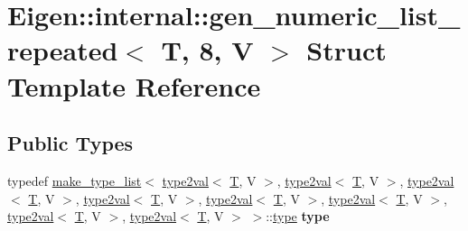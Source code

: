 \hypertarget{struct_eigen_1_1internal_1_1gen__numeric__list__repeated_3_01_t_00_018_00_01_v_01_4}{}\section{Eigen\+:\+:internal\+:\+:gen\+\_\+numeric\+\_\+list\+\_\+repeated$<$ T, 8, V $>$ Struct Template Reference}
\label{struct_eigen_1_1internal_1_1gen__numeric__list__repeated_3_01_t_00_018_00_01_v_01_4}
\subsection*{Public Types}
\begin{DoxyCompactItemize}
\item 
\mbox{\label{struct_eigen_1_1internal_1_1gen__numeric__list__repeated_3_01_t_00_018_00_01_v_01_4_a68ce8534030aa7d4100ef2ffe7a4a3a9}} 
typedef \hyperlink{struct_eigen_1_1internal_1_1make__type__list}{make\+\_\+type\+\_\+list}$<$ \hyperlink{struct_eigen_1_1internal_1_1type2val}{type2val}$<$ \hyperlink{group___sparse_core___module}{T}, V $>$, \hyperlink{struct_eigen_1_1internal_1_1type2val}{type2val}$<$ \hyperlink{group___sparse_core___module}{T}, V $>$, \hyperlink{struct_eigen_1_1internal_1_1type2val}{type2val}$<$ \hyperlink{group___sparse_core___module}{T}, V $>$, \hyperlink{struct_eigen_1_1internal_1_1type2val}{type2val}$<$ \hyperlink{group___sparse_core___module}{T}, V $>$, \hyperlink{struct_eigen_1_1internal_1_1type2val}{type2val}$<$ \hyperlink{group___sparse_core___module}{T}, V $>$, \hyperlink{struct_eigen_1_1internal_1_1type2val}{type2val}$<$ \hyperlink{group___sparse_core___module}{T}, V $>$, \hyperlink{struct_eigen_1_1internal_1_1type2val}{type2val}$<$ \hyperlink{group___sparse_core___module}{T}, V $>$, \hyperlink{struct_eigen_1_1internal_1_1type2val}{type2val}$<$ \hyperlink{group___sparse_core___module}{T}, V $>$ $>$\+::\hyperlink{struct_eigen_1_1internal_1_1type__list}{type} {\bfseries type}
\item 
\mbox{\label{struct_eigen_1_1internal_1_1gen__numeric__list__repeated_3_01_t_00_018_00_01_v_01_4_a68ce8534030aa7d4100ef2ffe7a4a3a9}} 

\end{DoxyCompactItemize}
